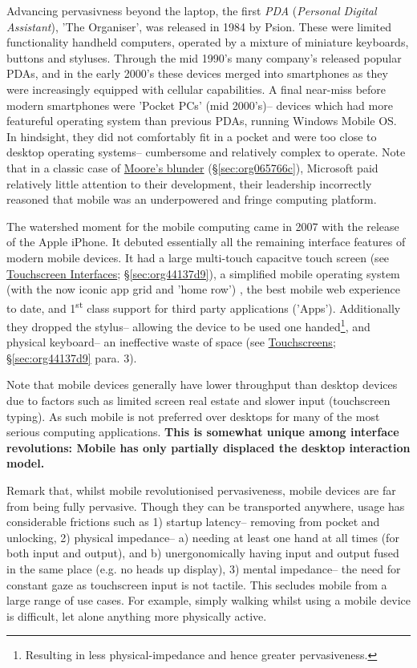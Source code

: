 \documentclass[logo,bsc,singlespacing,parskip]{infthesis}
\begin{document}
Advancing pervasivness beyond the laptop, the first \emph{PDA} (\emph{Personal Digital Assistant}), 'The Organiser', was released in 1984 by Psion.
These were limited functionality handheld computers, operated by a mixture of miniature keyboards, buttons and styluses.
Through the mid 1990's many company's released popular PDAs, and in the early 2000's these devices merged into smartphones as they were increasingly equipped with cellular capabilities.
A final near-miss before modern smartphones were 'Pocket PCs' (mid 2000's)-- devices which had more featureful operating system than previous PDAs, running Windows Mobile OS.
In hindsight, they did not comfortably fit in a pocket and were too close to desktop operating systems-- cumbersome and relatively complex to operate.
Note that in a classic case of \hyperref[sec:org065766c]{Moore's blunder} (\S \ref{sec:org065766c}), Microsoft paid relatively little attention to their development, their leadership incorrectly reasoned that mobile was an underpowered and fringe computing platform.

The watershed moment for the mobile computing came in 2007 with the release of the Apple iPhone.
It debuted essentially all the remaining interface features of modern mobile devices.
It had a large multi-touch capacitve touch screen (see \hyperref[sec:org44137d9]{Touchscreen Interfaces}; \S \ref{sec:org44137d9}), a simplified mobile operating system (with the now iconic app grid and 'home row')  , the best mobile web experience to date, and 1\textsuperscript{st} class support for third party applications ('Apps').
Additionally they dropped the stylus-- allowing the device to be used one handed\footnote{Resulting in less physical-impedance and hence greater pervasiveness.}, and physical keyboard-- an ineffective waste of space (see \hyperref[sec:org44137d9]{Touchscreens}; \S \ref{sec:org44137d9} para. 3).

Note that mobile devices generally have lower throughput than desktop devices due to factors such as limited screen real estate and slower input (touchscreen typing).
As such mobile is not preferred over desktops for many of the most serious computing applications.
\textbf{This is somewhat unique among interface revolutions: Mobile has only partially displaced the desktop interaction model.}

Remark that, whilst mobile revolutionised pervasiveness, mobile devices are far from being fully pervasive.
Though they can be transported anywhere, usage has considerable frictions such as 1) startup latency-- removing from pocket and unlocking, 2) physical impedance-- a) needing at least one hand at all times (for both input and output), and b) unergonomically having input and output fused in the same place (e.g. no heads up display), 3) mental impedance-- the need for constant gaze as touchscreen input is not tactile.
This secludes mobile from a large range of use cases.
For example, simply walking whilst using a mobile device is difficult, let alone anything more physically active.
\end{document}
